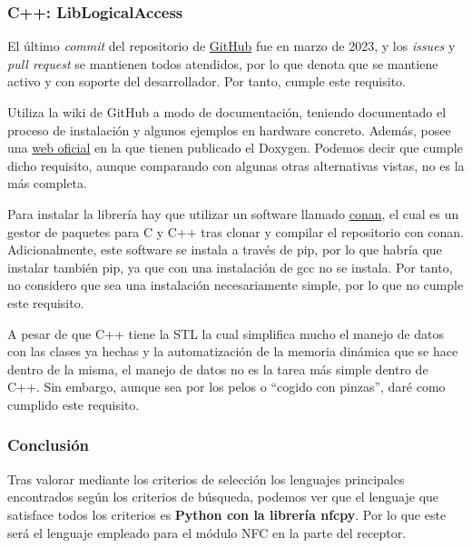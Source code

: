 \subsubsection{C++: LibLogicalAccess}

\begin{todolist}
    \item [\xcmark] El último \emph{commit} del repositorio de
    \href{https://github.com/liblogicalaccess/liblogicalaccess}{GitHub} fue en
    marzo de 2023, y los \emph{issues} y \emph{pull request} se mantienen todos
    atendidos, por lo que denota que se mantiene activo y con soporte del
    desarrollador. Por tanto, cumple este requisito.
    \item [\xcmark] Utiliza la wiki de GitHub a modo de documentación, teniendo
    documentado el proceso de instalación y algunos ejemplos en hardware
    concreto. Además, posee una \href{https://liblogicalaccess.com/}{web oficial}
    en la que tienen publicado el Doxygen. Podemos decir que cumple dicho requisito,
    aunque comparando con algunas otras alternativas vistas, no es la más
    completa.
    \item Para instalar la librería hay que utilizar un software llamado
    \href{https://conan.io/}{conan}, el cual es un gestor de paquetes para C y
    C++ tras clonar y compilar el repositorio con conan. Adicionalmente, este
    software se instala a través de pip, por lo que habría que instalar también
    pip, ya que con una instalación de gcc no se instala. Por tanto, no considero
    que sea una instalación necesariamente simple, por lo que no cumple este
    requisito.
    \item [\xcmark] A pesar de que C++ tiene la STL la cual simplifica mucho el manejo de
    datos con las clases ya hechas y la automatización de la memoria dinámica
    que se hace dentro de la misma, el manejo de datos no es la tarea más simple
    dentro de C++. Sin embargo, aunque sea por los pelos o ``cogido con pinzas'',
    daré como cumplido este requisito.
\end{todolist}

\subsubsection{Conclusión}

Tras valorar mediante los criterios de selección los lenguajes principales
encontrados según los criterios de búsqueda, podemos ver que el lenguaje que
satisface todos los criterios es \textbf{Python con la librería nfcpy}. Por lo que este
será el lenguaje empleado para el módulo NFC en la parte del receptor.

